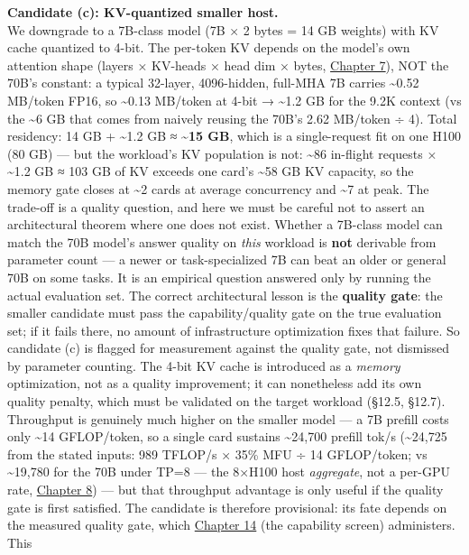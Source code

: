 \textbf{Candidate (c): KV-quantized smaller host.}\\
We downgrade to a 7B-class model (7B × 2 bytes = 14 GB weights) with KV
cache quantized to 4-bit. The per-token KV depends on the model's own
attention shape (layers × KV-heads × head dim × bytes, \hyperref[chap:7]{Chapter 7}), NOT
the 70B's constant: a typical 32-layer, 4096-hidden, full-MHA 7B carries
\textasciitilde0.52 MB/token FP16, so \textasciitilde0.13 MB/token at
4-bit → \textasciitilde1.2 GB for the 9.2K context (vs the
\textasciitilde6 GB that comes from naively reusing the 70B's 2.62
MB/token ÷ 4). Total residency: 14 GB + \textasciitilde1.2 GB ≈
\textbf{\textasciitilde15 GB}, which is a single-request fit on one H100
(80 GB) --- but the workload's KV population is not: \textasciitilde86
in-flight requests × \textasciitilde1.2 GB ≈ 103 GB of KV exceeds one
card's \textasciitilde58 GB KV capacity, so the memory gate closes at
\textasciitilde2 cards at average concurrency and \textasciitilde7 at
peak. The trade-off is a quality question, and here we must be careful
not to assert an architectural theorem where one does not exist. Whether
a 7B-class model can match the 70B model's answer quality on \emph{this}
workload is \textbf{not} derivable from parameter count --- a newer or
task-specialized 7B can beat an older or general 70B on some tasks. It
is an empirical question answered only by running the actual evaluation
set. The correct architectural lesson is the \textbf{quality gate}: the
smaller candidate must pass the capability/quality gate on the true
evaluation set; if it fails there, no amount of infrastructure
optimization fixes that failure. So candidate (c) is flagged for
measurement against the quality gate, not dismissed by parameter
counting. The 4-bit KV cache is introduced as a \emph{memory}
optimization, not as a quality improvement; it can nonetheless add its
own quality penalty, which must be validated on the target workload
(§12.5, §12.7). Throughput is genuinely much higher on the smaller model
--- a 7B prefill costs only \textasciitilde14 GFLOP/token, so a single
card sustains \textasciitilde24,700 prefill tok/s (\textasciitilde24,725
from the stated inputs: 989 TFLOP/s × 35\% MFU ÷ 14 GFLOP/token; vs
\textasciitilde19,780 for the 70B under TP=8 --- the 8×H100 host
\emph{aggregate}, not a per-GPU rate, \hyperref[chap:8]{Chapter 8}) --- but that throughput
advantage is only useful if the quality gate is first satisfied. The
candidate is therefore provisional: its fate depends on the measured
quality gate, which \hyperref[chap:14]{Chapter 14} (the capability screen) administers. This
